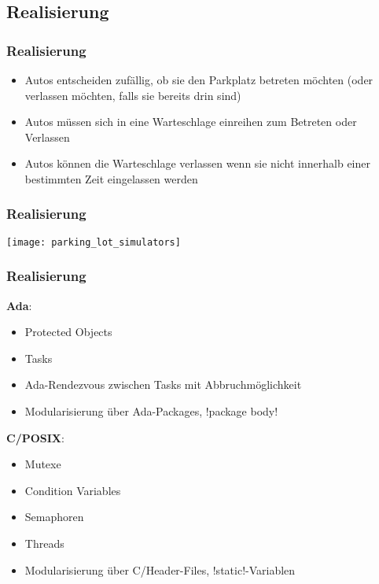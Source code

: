 \documentclass[ngerman]{presentation}
\begin{document}
\subsection{Realisierung}
\label{sec:realisierung}

\begin{frame}[c,label=realisierung]
    \frametitle{Realisierung}

    \begin{itemize}
        \item Autos entscheiden zufällig, ob sie den Parkplatz betreten möchten
            (oder verlassen möchten, falls sie bereits drin sind)
        \item Autos müssen sich in eine Warteschlage einreihen zum Betreten oder
            Verlassen
        \item Autos können die Warteschlage verlassen wenn sie nicht innerhalb
            einer bestimmten Zeit eingelassen werden
    \end{itemize}
\end{frame}

\begin{frame}[c,label=realisierung]
    \frametitle{Realisierung}

    \centering
    \vspace{-0.6cm}\hspace*{-0.9cm}\texttt{[image: parking\_lot\_simulators]}
\end{frame}

\begin{frame}[c,label=realisierung]
    \frametitle{Realisierung}

    \textbf{Ada}:
    \begin{itemize}
        \item Protected Objects
        \item Tasks
        \item Ada-Rendezvous zwischen Tasks mit Abbruchmöglichkeit
        \item Modularisierung über Ada-Packages, \adainline!package body!
    \end{itemize}

    \pause

    \textbf{C/POSIX}:
    \begin{itemize}
        \item Mutexe
        \item Condition Variables
        \item Semaphoren
        \item Threads
        \item Modularisierung über C/Header-Files, \cinline!static!-Variablen
    \end{itemize}
\end{frame}
\end{document}
